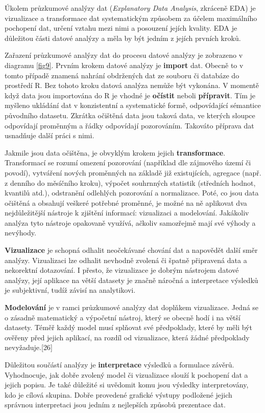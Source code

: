 \documentclass[12pt,]{article}
\begin{document}
\qquad Úkolem průzkumové analýzy dat (\emph{Explanatory Data Analysis},
zkráceně EDA) je vizualizace a transformace dat systematickým způsobem
za účelem maximálního pochopení dat, určení vztahu mezi nimi a posouzení
jejích kvality. EDA je důležitou části datové analýzy a měla by být
jedním z jejích prvních kroků.

\qquad Zařazení průzkumové analýzy dat do procesu datové analýzy je
zobrazeno v diagramu \ref{fig9}. Prvním krokem datové analýzy je
\textbf{import} dat. Obecně to v tomto případě znamená nahrání
obdržených dat ze souboru či databáze do prostředí R. Bez tohoto kroku
datová analýza nemůže být vykonána. V momentě když data jsou importována
do R je vhodné je \textbf{očístit} neboli \textbf{přípravit}. Tím je
myšleno ukládání dat v konzistentní a systematické formě, odpovídající
sémantice původního datasetu. Zkrátka očištěná data jsou taková data, ve
kterých sloupce odpovídají proměnným a řádky odpovídají pozorováním.
Takováto příprava dat usnadňuje další práci s nimi.

\qquad Jakmile jsou data očištěna, je obvyklým krokem jejich
\textbf{transformace}. Transformací se rozumí omezení pozorování
(například dle zájmového území či povodí), vytváření nových proměnných
na základě již existujících, agregace (např. z denního do měsíčního
kroku), výpočet souhrnných statistik (středních hodnot, kvantilů atd.),
odstranění odlehlých pozorování a normalizace. Poté, co jsou data
očištěná a obsahují veškeré potřebné proměnné, je možné na ně aplikovat
dva nejdůležitější nástroje k zjištění informací: vizualizaci a
modelování. Jakákoliv analýza tyto nástroje opakovaně využívá, ačkoliv
samozřejmě mají své výhody a nevýhody.

\qquad \textbf{Vizualizace} je schopná odhalit neočekávané chování dat a
napovědět další směr analýzy. Vizualizaci lze odhalit nevhodně zvolená
či špatně připravená data a nekorektní dotazování. I přesto, že
vizualizace je dobrým nástrojem datové analýzy, její aplikace na větší
datasety je značně náročná a interpretace výsledků je subjektivní, tudíž
závisí na analytikovi.

\qquad \textbf{Modelování} je v ramci průzkumové analýzy dat doplňkem
vizualizace. Jedná se o zásadně matematický a výpočetní nástroj, který
se obecně hodí i na větší datasety. Téměř každý model musí splňovat své
předpoklady, které by měli být ověřeny před jejich aplikací, na rozdíl
od vizualizace, která žádné předpoklady nevyžaduje.{[}26{]}

\qquad Důležitou součástí analýzy je \textbf{interpretace} výsledků a
formulace závěrů. Vyhodnocuje, jak dobře zvolený model či vizualizace
slouží k pochopení dat a jejich popisu. Je také důležité si uvědomit
komu jsou výsledky interpretovány, kdo je cílová skupina. Dobře
provedené grafické výstupy podložené jejich správnou interpretaci jsou
jedním z nejlepších způsobů prezentace dat.
\end{document}
